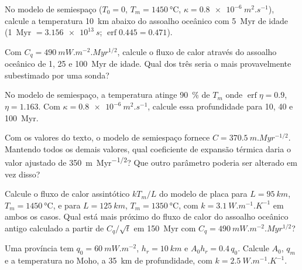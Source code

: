 \begin{exercise}[$\star$]\label{exo:b3:lithosphere-thermal-models:3}
No modelo de semiespaço ($T_0 = 0$, $T_m = \qty{1450}{\celsius}$, $\kappa =
\qty{0.8e-6}{m^2.s^{-1}}$), calcule a temperatura \qty{10}{km} abaixo do assoalho
oceânico com \qty{5}{Myr} de idade (\qty{1}{Myr} $= \qty{3.156e13}{s}$; $\operatorname{erf}
0.445 = 0.471$).
\end{exercise}

\begin{exercise}[$\star$]\label{exo:b3:lithosphere-thermal-models:4}
Com $C_q = \qty{490}{mW.m^{-2}.Myr^{1/2}}$, calcule o fluxo de calor através do
assoalho oceânico de 1, 25 e \qty{100}{Myr} de idade. Qual dos três seria o mais
provavelmente subestimado por uma sonda?
\end{exercise}

\begin{exercise}[$\star\star$]\label{exo:b3:lithosphere-thermal-models:5}
No modelo de semiespaço, a temperatura atinge \qty{90}{\percent} de $T_m$
onde $\operatorname{erf}\eta = 0.9$, $\eta = 1.163$. Com $\kappa =
\qty{0.8e-6}{m^2.s^{-1}}$, calcule essa profundidade para 10, 40 e \qty{100}{Myr}.
\end{exercise}

\begin{exercise}[$\star\star$]\label{exo:b3:lithosphere-thermal-models:6}
Com os valores do texto, o modelo de semiespaço fornece $C =
\qty{370.5}{m.Myr^{-1/2}}$. Mantendo todos os demais valores, qual coeficiente de expansão térmica
daria o valor ajustado de \qty{350}{m.Myr^{-1/2}}? Que outro parâmetro
poderia ser alterado em vez disso?
\end{exercise}

\begin{exercise}[$\star\star$]\label{exo:b3:lithosphere-thermal-models:7}
Calcule o fluxo de calor assintótico $kT_m/L$ do modelo de placa para $L =
\qty{95}{km}$, $T_m = \qty{1450}{\celsius}$, e para $L = \qty{125}{km}$,
$T_m = \qty{1350}{\celsius}$, com $k = \qty{3.1}{W.m^{-1}.K^{-1}}$ em ambos os casos.
Qual está mais próximo do fluxo de calor do assoalho oceânico antigo calculado a partir de $C_q/\sqrt t$
em \qty{150}{Myr} com $C_q = \qty{490}{mW.m^{-2}.Myr^{1/2}}$?
\end{exercise}

\begin{exercise}[$\star\star$]\label{exo:b3:lithosphere-thermal-models:8}
Uma província tem $q_0 = \qty{60}{mW.m^{-2}}$, $h_r = \qty{10}{km}$ e $A_0h_r =
0.4\,q_0$. Calcule $A_0$, $q_m$ e a temperatura no Moho, a \qty{35}{km}
de profundidade, com $k = \qty{2.5}{W.m^{-1}.K^{-1}}$.
\end{exercise}

